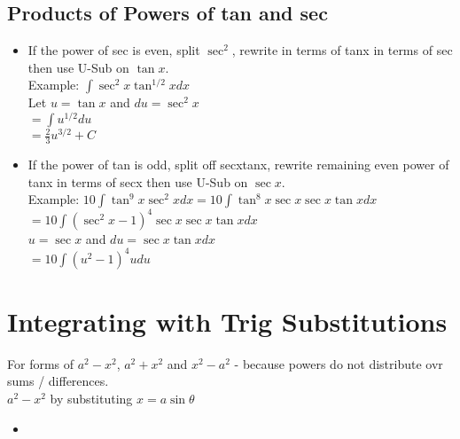 \documentclass{article}
\begin{document}
\subsection{Products of Powers of tan and sec}
\begin{itemize}
  \item If the power of sec is even, split $\sec^2$, rewrite in terms of tanx in terms of sec then use U-Sub on $\tan x$.\\
  Example: $\int{\sec^2x\tan^{1/2}x dx}$\\
  Let $u = \tan{x}$ and $du = \sec^2{x}$\\
  $= \int{u^{1/2}du}$\\
  $= \frac{2}{3}u^{3/2} + C$\\
  \item If the power of tan is odd, split off secxtanx, rewrite remaining even power of tanx in terms of secx then use U-Sub on $\sec{x}$.\\
  Example: $10\int{\tan^9{x}\sec^2{x}dx} = 10\int{\tan^8{x}\sec{x}\sec{x}\tan{x}dx}$\\
  $= 10\int{(\sec^2{x} - 1)^4 \sec{x}\sec{x}\tan{x} dx}$\\
  $u = \sec{x}$ and $du = \sec{x}\tan{x}dx$\\
  $= 10\int{(u^2 - 1)^4 u du}$\\
\end{itemize}

\section{Integrating with Trig Substitutions}
For forms of $a^2 - x^2$, $a^2 + x^2$ and $x^2 - a^2$ - because powers do not distribute ovr sums / differences.\\
$a^2 - x^2$ by substituting $x = a\sin{\theta}$
\begin{itemize}
  \item
\end{itemize}
\end{document}
